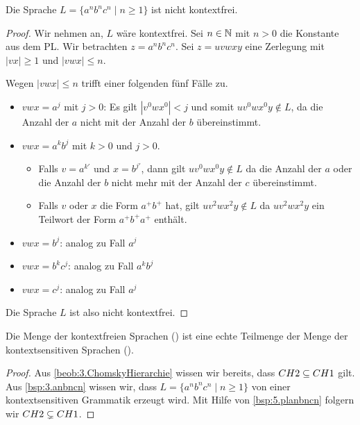\begin{lemma}\label{bsp:5.planbncn}
Die Sprache $L=\{a^nb^nc^n \mid n\geq 1\}$ ist nicht kontextfrei.
\end{lemma}
\begin{proof}
	Wir nehmen an, $L$ wäre kontextfrei.
	Sei $n\in\mathbb{N}$ mit $n>0$ die Konstante aus dem \ac{PL}.
	Wir betrachten $z=a^nb^nc^n$. 
	Sei $z = uvwxy$ eine Zerlegung mit $|vx| \ge 1$ und $|vwx| \le n$.
	
	Wegen $|vwx| \le n$ trifft einer folgenden fünf Fälle zu.
	\begin{itemize}
		\item $vwx = a^j$ mit $j>0$: 
		Es gilt $|v^0wx^0| < j$ und somit $uv^0wx^0y\notin L$,
		da die Anzahl der $a$ nicht mit der Anzahl der $b$ übereinstimmt.
		\item $vwx = a^kb^j$ mit $k>0$ und $j>0$.
		\begin{itemize}
			\item Falls $v = a^{k'}$ und $x = b^{j'}$, dann gilt $uv^0wx^0y\notin L$ da die Anzahl der $a$ oder die Anzahl der $b$ nicht mehr mit der Anzahl der $c$ übereinstimmt.
			\item Falls $v$ oder $x$ die Form $a^+b^+$ hat, gilt $uv^2wx^2y\notin L$ da $uv^2wx^2y$ ein Teilwort der Form $a^+b^+a^+$ enthält.
		\end{itemize}
		\item $vwx = b^j$: analog zu Fall $a^j$
		\item $vwx = b^kc^j$: analog zu Fall $a^kb^j$
		\item $vwx = c^j$: analog zu Fall $a^j$
	\end{itemize}
	Die Sprache $L$ ist also nicht kontextfrei.
\end{proof}




\begin{lemma} %

  Die Menge der kontextfreien Sprachen (\cht) ist eine echte Teilmenge der Menge der kontextsensitiven Sprachen (\cho).
\end{lemma}
\begin{proof}
Aus \autoref{beob:3.ChomskyHierarchie} wissen wir bereits, dass $CH2 \subseteq CH1$ gilt.
Aus \autoref{bsp:3.anbncn} wissen wir, dass $L=\{a^nb^nc^n \mid n\geq 1\}$ von einer kontextsensitiven Grammatik erzeugt wird.
Mit Hilfe von \autoref{bsp:5.planbncn} folgern wir $CH2 \subsetneq CH1$.
\end{proof}

